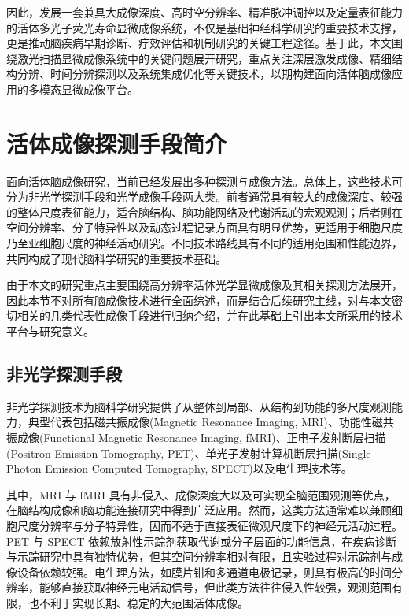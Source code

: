 因此，发展一套兼具大成像深度、高时空分辨率、精准脉冲调控以及定量表征能力的活体多光子荧光寿命显微成像系统，不仅是基础神经科学研究的重要技术支撑，更是推动脑疾病早期诊断、疗效评估和机制研究的关键工程途径。基于此，本文围绕激光扫描显微成像系统中的关键问题展开研究，重点关注深层激发成像、精细结构分辨、时间分辨探测以及系统集成优化等关键技术，以期构建面向活体脑成像应用的多模态显微成像平台。


\section{活体成像探测手段简介}\label{1.2}

面向活体脑成像研究，当前已经发展出多种探测与成像方法。总体上，这些技术可分为非光学探测手段和光学成像手段两大类。前者通常具有较大的成像深度、较强的整体尺度表征能力，适合脑结构、脑功能网络及代谢活动的宏观观测；后者则在空间分辨率、分子特异性以及动态过程记录方面具有明显优势，更适用于细胞尺度乃至亚细胞尺度的神经活动研究。不同技术路线具有不同的适用范围和性能边界，共同构成了现代脑科学研究的重要技术基础。

由于本文的研究重点主要围绕高分辨率活体光学显微成像及其相关探测方法展开，因此本节不对所有脑成像技术进行全面综述，而是结合后续研究主线，对与本文密切相关的几类代表性成像手段进行归纳介绍，并在此基础上引出本文所采用的技术平台与研究意义。

\subsection{非光学探测手段}\label{1.2.1}

非光学探测技术为脑科学研究提供了从整体到局部、从结构到功能的多尺度观测能力，典型代表包括磁共振成像(Magnetic Resonance Imaging, MRI)\cite{RN2107}、功能性磁共振成像(Functional Magnetic Resonance Imaging, fMRI)\cite{RN2006}、正电子发射断层扫描(Positron Emission Tomography, PET)\cite{RN2008}、单光子发射计算机断层扫描(Single-Photon Emission Computed Tomography, SPECT)\cite{RN2009}以及电生理技术\cite{RN2011}等。

其中，MRI 与 fMRI 具有非侵入、成像深度大以及可实现全脑范围观测等优点，在脑结构成像和脑功能连接研究中得到广泛应用。然而，这类方法通常难以兼顾细胞尺度分辨率与分子特异性，因而不适于直接表征微观尺度下的神经元活动过程。PET 与 SPECT 依赖放射性示踪剂获取代谢或分子层面的功能信息，在疾病诊断与示踪研究中具有独特优势，但其空间分辨率相对有限，且实验过程对示踪剂与成像设备依赖较强。电生理方法，如膜片钳和多通道电极记录，则具有极高的时间分辨率，能够直接获取神经元电活动信号，但此类方法往往侵入性较强，观测范围有限，也不利于实现长期、稳定的大范围活体成像。

